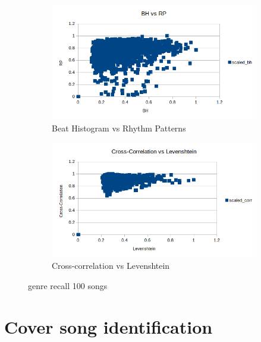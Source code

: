 \begin{figure}[htbp]
{{			\begin{subfigure}{.495\textwidth}
				\centering    
				\includegraphics[scale=0.5]{Images/SparkFeat/BH_RP.png}
				\caption{Beat Histogram vs Rhythm Patterns}
				\label{fs3}
			\end{subfigure}
			\begin{subfigure}{.495\textwidth}
				\centering     
				\includegraphics[scale=0.5]{Images/SparkFeat/Cross-Corr_Levenshtein.png}
				\caption{Cross-correlation vs Levenshtein}
				\label{fs4}
			\end{subfigure}%
	}}
	\caption{genre recall 100 songs}
	\label{fig:featsep}
\end{figure}
\FloatBarrier

\section{Cover song identification}\label{covsongid}

